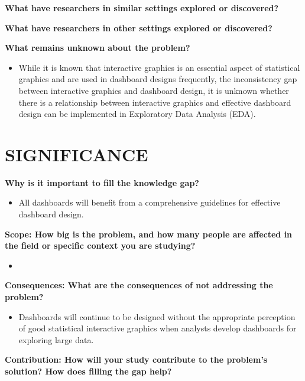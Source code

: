 \documentclass[print]{nuthesis}
\providecommand{\tightlist}{%
  \setlength{\itemsep}{0pt}\setlength{\parskip}{0pt}}
\begin{document}
\textbf{What have researchers in similar settings explored or discovered?}

\textbf{What have researchers in other settings explored or discovered?}

\textbf{What remains unknown about the problem?}

\begin{itemize}
\tightlist
\item
  While it is known that interactive graphics is an essential aspect of statistical graphics and are used in dashboard designs frequently, the inconsistency gap between interactive graphics and dashboard design, it is unknown whether there is a relationship between interactive graphics and effective dashboard design can be implemented in Exploratory Data Analysis (EDA).
\end{itemize}

\hypertarget{significance}{%
\chapter{SIGNIFICANCE}\label{significance}}

\textbf{Why is it important to fill the knowledge gap?}

\begin{itemize}
\tightlist
\item
  All dashboards will benefit from a comprehensive guidelines for effective dashboard design.
\end{itemize}

\textbf{Scope: How big is the problem, and how many people are affected in the field or specific context you are studying?}

\begin{itemize}
\tightlist
\item
\end{itemize}

\textbf{Consequences: What are the consequences of not addressing the problem?}

\begin{itemize}
\tightlist
\item
  Dashboards will continue to be designed without the appropriate perception of good statistical interactive graphics when analysts develop dashboards for exploring large data.
\end{itemize}

\textbf{Contribution: How will your study contribute to the problem's solution? How does filling the gap help?}
\end{document}
